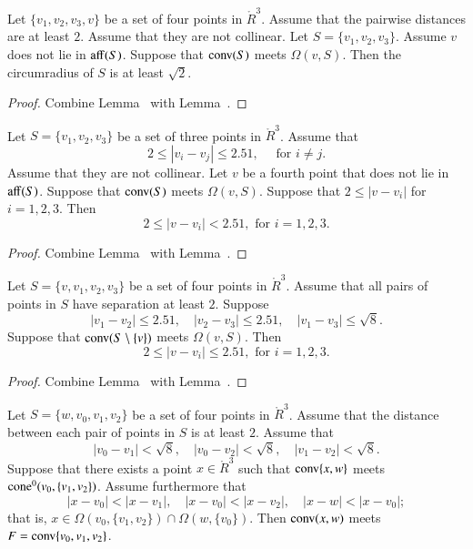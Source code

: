 \newpage
\begin{lemma}
Let $\{v_1,v_2,v_3,v\}$ be a set of four points in $\ring{R}^3$. Assume that the pairwise
distances are at least $2$.
Assume that they are not collinear. 
Let $S=\{v_1,v_2,v_3\}$.
Assume $v$ does not lie in ${\operatorname{aff}}(S)$.  Suppose that
${\operatorname{conv}}(S)$ meets $\Omega(v,S)$.  Then the circumradius
of $S$ is at least $\sqrt2$.
\end{lemma}

\begin{proof} Combine Lemma~ with
Lemma~.
\end{proof}

\begin{lemma}
Let $S=\{v_1,v_2,v_3\}$ be a
set of three points in $\ring{R}^3$.  Assume that 
  $$
  2\le |v_i-v_j|\le 2.51, \quad\text{ for } i\ne j.
  $$
Assume that they are not collinear. Let $v$ be a fourth
point that does not lie in ${\operatorname{aff}}(S)$.  Suppose that
${\operatorname{conv}}(S)$ meets $\Omega(v,S)$.
Suppose that $2\le |v-v_i|$ for $i=1,2,3$.
Then
  $$
  2 \le |v-v_i | < 2.51, \text{ for } i=1,2,3.
  $$
\end{lemma}

\begin{proof}
Combine Lemma~ with Lemma~.
\end{proof}

\newpage


\begin{lemma}
Let $S=\{v,v_1,v_2,v_3\}$ be a
set of four points in $\ring{R}^3$.   
Assume that all pairs of points in $S$ have separation at
least $2$.  Suppose
  $$
  |v_1-v_2|\le 2.51,\quad 
  |v_2-v_3|\le 2.51,\quad
  |v_1-v_3|\le \sqrt{8}.
  $$
Suppose that
${\operatorname{conv}}(S\setminus \{v\})$ meets $\Omega(v,S)$.
Then
  $$
  2 \le |v-v_i | \le 2.51, \text{ for } i=1,2,3.
  $$
\end{lemma}

\begin{proof}
Combine Lemma~ with Lemma~.
\end{proof}

\newpage


\begin{lemma}
Let $S=\{w,v_0,v_1,v_2\}$ be a set of four points
in $\ring{R}^3$.  Assume that the distance between each pair
of points in $S$
is at least $2$.  Assume that
   $$
   |v_0-v_1| < \sqrt8,\quad |v_0-v_2| < \sqrt8,\quad |v_1-v_2| < \sqrt8.
   $$
Suppose that there exists a point $x\in\ring{R}^3$
such that 
  ${\operatorname{conv}}\{x,w\}$ meets ${\operatorname{cone}}^0(v_0,\{v_1,v_2\})$.  
Assume furthermore that
  $$
  |x-v_0| < |x-v_1|,\quad 
  |x-v_0| < |x-v_2|,\quad
  |x-w| < |x-v_0|;
  $$
that is, $x\in\Omega(v_0,\{v_1,v_2\})\cap \Omega(w,\{v_0\})$.
Then ${\operatorname{conv}}(x,w)$ meets $F={\operatorname{conv}}\{v_0,v_1,v_2\}$.
\end{lemma}


